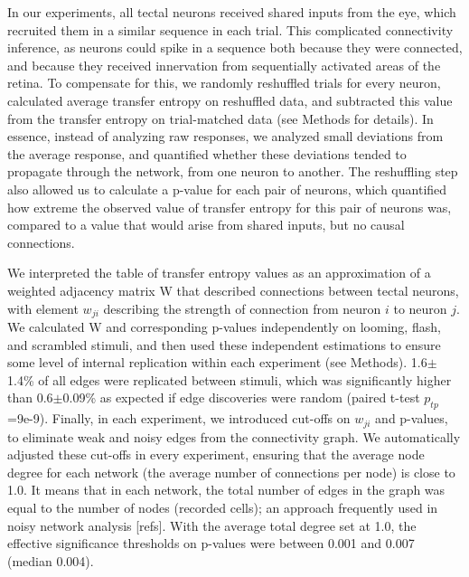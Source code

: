 \documentclass{article}
\begin{document}
In our experiments, all tectal neurons received shared inputs from the eye, which recruited them in a similar sequence in each trial. This complicated connectivity inference, as neurons could spike in a sequence both because they were connected, and because they received innervation from sequentially activated areas of the retina. To compensate for this, we randomly reshuffled trials for every neuron, calculated average transfer entropy on reshuffled data, and subtracted this value from the transfer entropy on trial-matched data \citep{gourevitch2007te,wollstadt2014te} (see Methods for details). In essence, instead of analyzing raw responses, we analyzed small deviations from the average response, and quantified whether these deviations tended to propagate through the network, from one neuron to another. The reshuffling step also allowed us to calculate a p-value for each pair of neurons, which quantified how extreme the observed value of transfer entropy for this pair of neurons was, compared to a value that would arise from shared inputs, but no causal connections.

We interpreted the table of transfer entropy values as an approximation of a weighted adjacency matrix W that described connections between tectal neurons, with element $w_{ji}$ describing the strength of connection from neuron $i$ to neuron $j$. We calculated W and corresponding p-values independently on looming, flash, and scrambled stimuli, and then used these independent estimations to ensure some level of internal replication within each experiment (see Methods). 1.6$\pm$1.4\% of all edges were replicated between stimuli, which was significantly higher than 0.6$\pm$0.09\% as expected if edge discoveries were random (paired t-test $p_{tp}$=9e-9). Finally, in each experiment, we introduced cut-offs on $w_{ji}$ and p-values, to eliminate weak and noisy edges from the connectivity graph. We automatically adjusted these cut-offs in every experiment, ensuring that the average node degree for each network (the average number of connections per node) is close to 1.0. It means that in each network, the total number of edges in the graph was equal to the number of nodes (recorded cells); an approach frequently used in noisy network analysis \citep{stetter2012te}[refs]. With the average total degree set at 1.0, the effective significance thresholds on p-values were between 0.001 and 0.007 (median 0.004).
\end{document}
